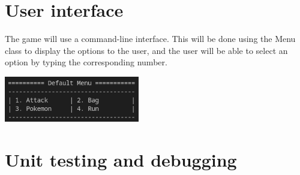 \documentclass{article}
\begin{document}
  \pagebreak
  
  \section{User interface}
  
  The game will use a command-line interface. This will be done using the Menu class to display the options to the user, and the user will be able to select an option by typing the corresponding number. 
  
  \begin{center}\includegraphics[height=2cm]{media/Menu.png}\end{center}
  
  \section{Unit testing and debugging}
    
\end{document}
